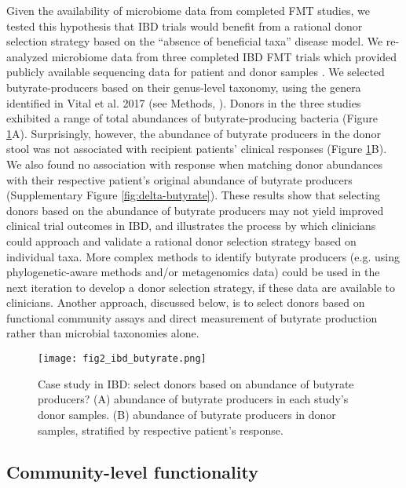 Given the availability of microbiome data from completed FMT studies, we tested this hypothesis that IBD trials would benefit from a rational donor selection strategy based on the ``absence of beneficial taxa'' disease model.
We re-analyzed microbiome data from three completed IBD FMT trials which provided publicly available sequencing data for patient and donor samples \cite{Kump2018,Goyal2018,Jacob2017}.
We selected butyrate-producers based on their genus-level taxonomy, using the genera identified in Vital et al. 2017 (see Methods, \cite{Vital2017}).
Donors in the three studies exhibited a range of total abundances of butyrate-producing bacteria (Figure \ref{fig:ibd-butyrate}A).
Surprisingly, however, the abundance of butyrate producers in the donor stool was not associated with recipient patients' clinical responses (Figure \ref{fig:ibd-butyrate}B).
We also found no association with response when matching donor abundances with their respective patient's original abundance of butyrate producers (Supplementary Figure \ref{fig:delta-butyrate}).
These results show that selecting donors based on the abundance of butyrate producers may not yield improved clinical trial outcomes in IBD, and illustrates the process by which clinicians could approach and validate a rational donor selection strategy based on individual taxa.
More complex methods to identify butyrate producers (e.g. using phylogenetic-aware methods and/or metagenomics data) could be used in the next iteration to develop a donor selection strategy, if these data are available to clinicians.
Another approach, discussed below, is to select donors based on functional community assays and direct measurement of butyrate production rather than microbial taxonomies alone.

\begin{figure}
    \begin{center}
    \texttt{[image: fig2\_ibd\_butyrate.png]}
    \caption{Case study in IBD: select donors based on abundance of butyrate producers? (A) abundance of butyrate producers in each study's donor samples. (B) abundance of butyrate producers in donor samples, stratified by respective patient's response.}\label{fig:ibd-butyrate}
    \end{center}
\end{figure}

\subsection{Community-level functionality}

